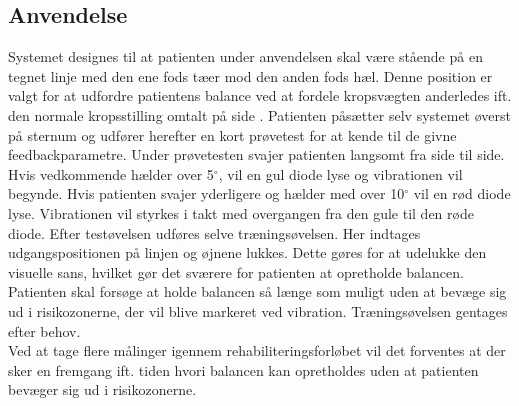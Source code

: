 \subsection{Anvendelse}
Systemet designes til at patienten under anvendelsen skal være stående på en tegnet linje med den ene fods tæer mod den anden fods hæl. Denne position er valgt for at udfordre patientens balance ved at fordele kropsvægten anderledes ift. den normale kropsstilling omtalt på side \pageref{BalanceAfsnit}. Patienten påsætter selv systemet øverst på sternum og udfører herefter en kort prøvetest for at kende til de givne feedbackparametre. Under prøvetesten svajer patienten langsomt fra side til side. Hvis vedkommende hælder over 5$^{\circ}$, vil en gul diode lyse og vibrationen vil begynde. Hvis patienten svajer yderligere og hælder med over 10$^{\circ}$ vil en rød diode lyse. Vibrationen vil styrkes i takt med overgangen fra den gule til den røde diode. Efter testøvelsen udføres selve træningsøvelsen. Her indtages udgangspositionen på linjen og øjnene lukkes. Dette gøres for at udelukke den visuelle sans, hvilket gør det sværere for patienten at opretholde balancen. Patienten skal forsøge at holde balancen så længe som muligt uden at bevæge sig ud i risikozonerne, der vil blive markeret ved vibration. Træningsøvelsen gentages efter behov. \\
Ved at tage flere målinger igennem rehabiliteringsforløbet vil det forventes at der sker en fremgang ift. tiden hvori balancen kan opretholdes uden at patienten bevæger sig ud i risikozonerne. 



